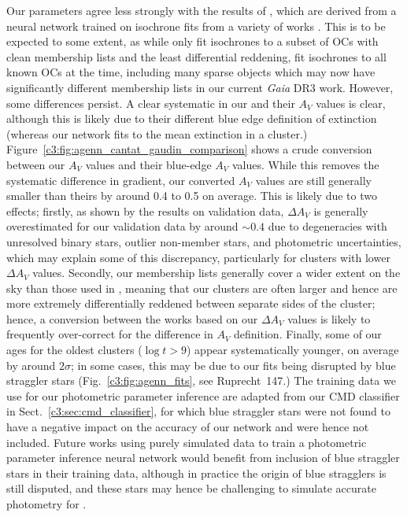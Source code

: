 Our parameters agree less strongly with the results of \cite{cantat-gaudin_painting_2020}, which are derived from a neural network trained on isochrone fits from a variety of works \citep[including][]{bossini_age_2019}. This is to be expected to some extent, as while \cite{bossini_age_2019} only fit isochrones to a subset of OCs with clean membership lists and the least differential reddening, \cite{cantat-gaudin_painting_2020} fit isochrones to all known OCs at the time, including many sparse objects which may now have significantly different membership lists in our current \emph{Gaia} DR3 work. However, some differences persist. A clear systematic in our and their $A_V$ values is clear, although this is likely due to their different blue edge definition of extinction (whereas our network fits to the mean extinction in a cluster.) Figure~\ref{c3:fig:agenn_cantat_gaudin_comparison} shows a crude conversion between our $A_V$ values and their blue-edge $A_V$ values. While this removes the systematic difference in gradient, our converted $A_V$ values are still generally smaller than theirs by around 0.4 to 0.5 on average. This is likely due to two effects; firstly, as shown by the results on validation data, $\Delta A_V$ is generally overestimated for our validation data by around $\sim0.4$ due to degeneracies with unresolved binary stars, outlier non-member stars, and photometric uncertainties, which may explain some of this discrepancy, particularly for clusters with lower $\Delta A_V$ values. Secondly, our membership lists generally cover a wider extent on the sky than those used in \cite{cantat-gaudin_painting_2020}, meaning that our clusters are often larger and hence are more extremely differentially reddened between separate sides of the cluster; hence, a conversion between the works based on our $\Delta A_V$ values is likely to frequently over-correct for the difference in $A_V$ definition. Finally, some of our ages for the oldest clusters ($\log t > 9$) appear systematically younger, on average by around $2\sigma$; in some cases, this may be due to our fits being disrupted by blue straggler stars (Fig.~\ref{c3:fig:agenn_fits}, see Ruprecht~147.) The training data we use for our photometric parameter inference are adapted from our CMD classifier in Sect.~\ref{c3:sec:cmd_classifier}, for which blue straggler stars were not found to have a negative impact on the accuracy of our network and were hence not included. Future works using purely simulated data to train a photometric parameter inference neural network would benefit from inclusion of blue straggler stars in their training data, although in practice the origin of blue stragglers is still disputed, and these stars may hence be challenging to simulate accurate photometry for \citep{boffin_ecology_2015, cantat-gaudin_milky_2022}.

